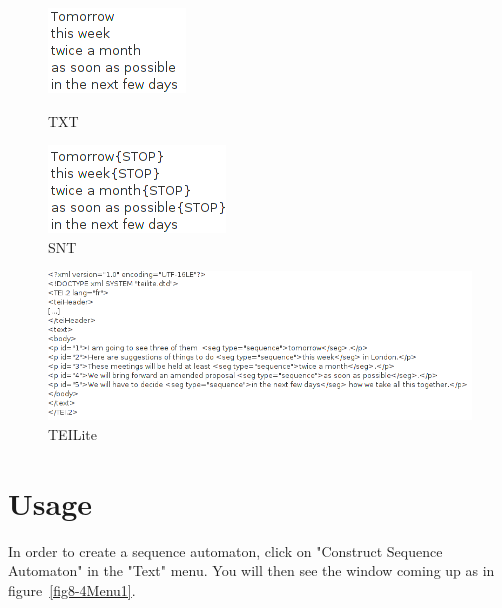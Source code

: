 \begin{figure}[h!]
	\begin{minipage}[h!]{0.5\linewidth}
		\centering
		\includegraphics[scale=0.6]{resources/img/fig8-1tomorrow.png}	
		\caption{TXT\label{fig8-1CorpusTxt}}
		\label{fig7-TXT}
	\end{minipage}
	\hspace{0.1cm}
	\begin{minipage}[h!]{0.5\linewidth}
		\centering
		\includegraphics[scale=0.6]{resources/img/fig8-2tomorrowSNT.png}
		\caption{SNT\label{fig8-2CorpusSNT}}
	\end{minipage}
	\hspace{0.1cm}
\end{figure}
\begin{figure}[h!]
	\begin{minipage}[h!]{\linewidth}
		\centering
			\includegraphics[width=14cm]{resources/img/fig8-3tomorrowTEI.png}
			\caption{TEILite\label{fig8-3CorpusTEI}}
	\end{minipage}
\end{figure}
\section{Usage}
In order to create a sequence automaton, click on "Construct Sequence Automaton" in the "Text" menu. You will then see the window coming up as in figure~\ref{fig8-4Menu1}.

